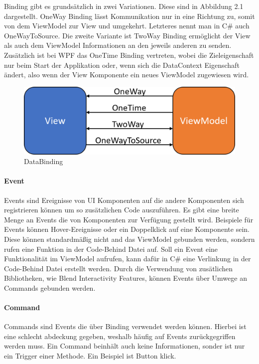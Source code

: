 \documentclass[titlepage=false,12pt]{scrreprt}
\begin{document}
Binding gibt es grundsätzlich in zwei Variationen. Diese sind in Abbildung 2.1 dargestellt. OneWay Binding
lässt Kommunikation nur in eine Richtung zu, somit von dem ViewModel zur View und umgekehrt.
Letzteres nennt man in C\# auch OneWayToSource. Die zweite Variante ist TwoWay Binding ermöglicht
der View als auch dem ViewModel Informationen an den jeweils anderen zu senden. Zusätzlich ist 
bei WPF das OneTime Binding vertreten, wobei die Zieleigenschaft nur beim Start der Applikation 
oder, wenn sich die DataContext Eigenschaft ändert, also wenn der View Komponente ein neues 
ViewModel zugewiesen wird.

\begin{figure}[h]
	\includegraphics[width=\textwidth]{Wpf_Binding.png}
	\caption[]{DataBinding}
\end{figure}


\paragraph{Event}

Events sind Ereignisse von UI Komponenten auf die andere Komponenten sich registrieren 
können um so zusätzlichen Code auszuführen. Es gibt eine breite Menge an Events die
von Komponenten zur Verfügung gestellt wird. Beispiele für Events können Hover-Ereignisse
oder ein Doppelklick auf eine Komponente sein.
Diese können standardmäßig nicht and das ViewModel
gebunden werden, sondern rufen eine Funktion in der Code-Behind Datei auf.
Soll ein Event eine Funktionalität im ViewModel aufrufen, kann dafür in C\# eine Verlinkung in der
Code-Behind Datei erstellt werden. Durch die Verwendung von zusätlichen Bibliotheken, wie
Blend Interactivity Features, können Events über Umwege an Commands gebunden werden.

\paragraph{Command}

Commands sind Events die über Binding verwendet werden können. Hierbei ist eine schlecht
abdeckung gegeben, weshalb häufig auf Events zurückgegriffen werden muss. Ein Command
beinhält auch keine Informationen, sonder ist nur ein Trigger einer Methode. Ein Beispiel
ist Button klick.
\end{document}
